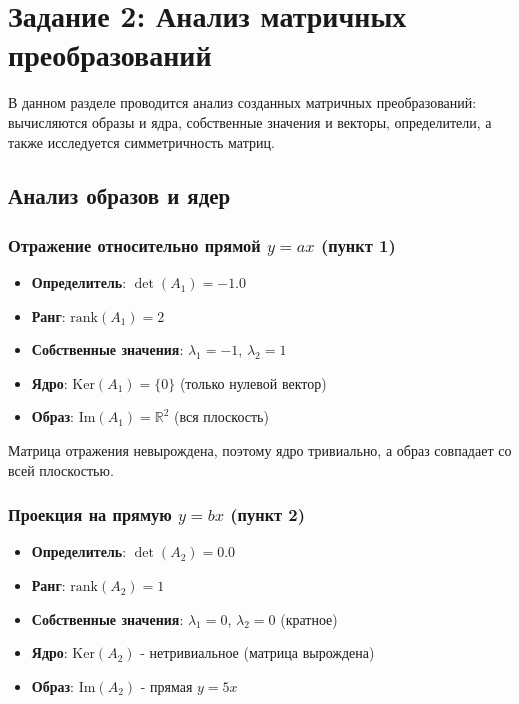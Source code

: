 \section*{Задание 2: Анализ матричных преобразований}

В данном разделе проводится анализ созданных матричных преобразований: вычисляются образы и ядра, собственные значения и векторы, определители, а также исследуется симметричность матриц.

\subsection*{Анализ образов и ядер}

\subsubsection*{Отражение относительно прямой $y = ax$ (пункт 1)}

\begin{itemize}
\item \textbf{Определитель}: $\det(A_1) = -1.0$
\item \textbf{Ранг}: $\text{rank}(A_1) = 2$
\item \textbf{Собственные значения}: $\lambda_1 = -1$, $\lambda_2 = 1$
\item \textbf{Ядро}: $\text{Ker}(A_1) = \{0\}$ (только нулевой вектор)
\item \textbf{Образ}: $\text{Im}(A_1) = \mathbb{R}^2$ (вся плоскость)
\end{itemize}

Матрица отражения невырождена, поэтому ядро тривиально, а образ совпадает со всей плоскостью.

\subsubsection*{Проекция на прямую $y = bx$ (пункт 2)}

\begin{itemize}
\item \textbf{Определитель}: $\det(A_2) = 0.0$
\item \textbf{Ранг}: $\text{rank}(A_2) = 1$
\item \textbf{Собственные значения}: $\lambda_1 = 0$, $\lambda_2 = 0$ (кратное)
\item \textbf{Ядро}: $\text{Ker}(A_2)$ - нетривиальное (матрица вырождена)
\item \textbf{Образ}: $\text{Im}(A_2)$ - прямая $y = 5x$
\end{itemize}


